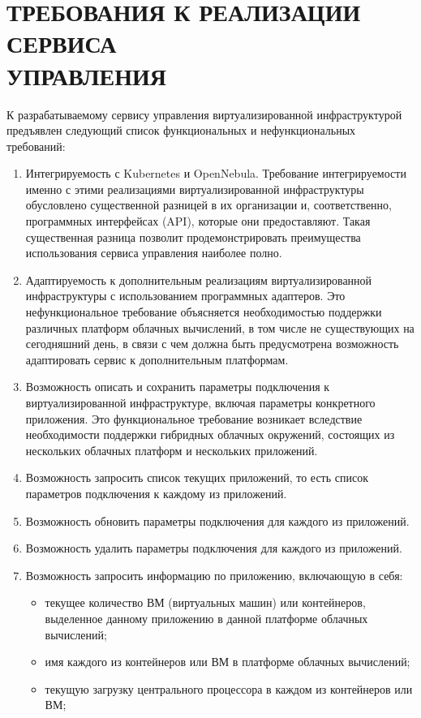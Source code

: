 \section{ТРЕБОВАНИЯ К РЕАЛИЗАЦИИ СЕРВИСА \\ УПРАВЛЕНИЯ}
\label{requirements}
К разрабатываемому сервису управления виртуализированной инфраструктурой предъявлен следующий список функциональных и нефункциональных требований:
\begin{enumerate}
    \item Интегрируемость с Kubernetes и OpenNebula.
    Требование интегрируемости именно с этими реализациями виртуализированной инфраструктуры обусловлено существенной разницей в их организации и, соответственно, программных интерфейсах (API), которые они предоставляют.
    Такая существенная разница позволит продемонстрировать преимущества использования сервиса управления наиболее полно.
    \item Адаптируемость к дополнительным реализациям виртуализированной инфраструктуры с использованием программных адаптеров.
    Это нефункциональное требование объясняется необходимостью поддержки различных платформ облачных вычислений, в том числе не существующих на сегодняшний день, в связи с чем должна быть предусмотрена возможность адаптировать сервис к дополнительным платформам. 
    \item Возможность описать и сохранить параметры подключения к виртуализированной инфраструктуре, включая параметры конкретного приложения.
    Это функциональное требование возникает вследствие необходимости поддержки гибридных облачных окружений, состоящих из нескольких облачных платформ и нескольких приложений.
    \item Возможность запросить список текущих приложений, то есть список параметров подключения к каждому из приложений. 
    \item Возможность обновить параметры подключения для каждого из приложений.
    \item Возможность удалить параметры подключения для каждого из приложений.
    \item Возможность запросить информацию по приложению, включающую в себя:
    \begin{itemize}
        \item текущее количество ВМ (виртуальных машин) или контейнеров, выделенное данному приложению в данной платформе облачных вычислений;
        \item имя каждого из контейнеров или ВМ в платформе облачных вычислений;
        \item текущую загрузку центрального процессора в каждом из контейнеров или ВМ;

\end{itemize}
\end{enumerate}
